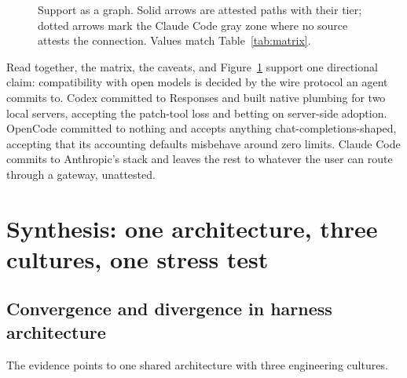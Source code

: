 \documentclass{article}
\newcommand{\codex}[0]{Codex}
\newcommand{\occ}[0]{OpenCode}
\newcommand{\ccc}[0]{Claude Code}
\begin{document}
\begin{figure}[t]
\caption{Support as a graph. Solid arrows are attested paths with their
tier; dotted arrows mark the \ccc{} gray zone where no source attests the
connection. Values match Table~\ref{tab:matrix}.}
\label{fig:support}
\end{figure}

Read together, the matrix, the caveats, and Figure~\ref{fig:support}
support one directional claim:
compatibility with open models is decided by the wire protocol an agent
commits to. \codex{} committed to Responses and built native plumbing
for two local servers, accepting the patch-tool loss and betting on
server-side adoption. \occ{} committed to nothing and accepts anything
chat-completions-shaped, accepting that its accounting defaults misbehave
around zero limits. \ccc{} commits to Anthropic's stack and leaves the
rest to whatever the user can route through a gateway, unattested.

\section{Synthesis: one architecture, three cultures, one stress test}
\label{sec:synthesis}

\subsection{Convergence and divergence in harness architecture}
\label{sec:convergence}

The evidence points to one shared architecture with three engineering
cultures.
\end{document}
